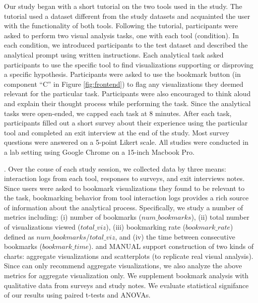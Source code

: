 Our study began with a short tutorial on the two tools used in the study.
The tutorial used a dataset different from the study datasets and acquainted
the user with the functionality of both tools.
Following the tutorial, participants were asked to perform two visual analysis 
tasks, one with each tool (condition).
In each condition, we introduced participants to the test dataset
and described the analytical prompt using written instructions.
Each analytical task asked participants to use the specific tool to find 
visualizations supporting or disproving a specific hypothesis.
Participants were asked to use the bookmark button (in component ``C'' in Figure 
\ref{fig:frontend}) to flag any visualizations they deemed relevant for the particular task.
Participants were also encouraged to think aloud and explain their thought process
while performing the task.
Since the analytical tasks were open-ended, we capped each task at 8 minutes.
After each task, participants filled out a short survey about their experience
using the particular tool and completed an exit interview at the end of the study.
Most survey questions were answered on a 5-point Likert scale.
All studies were conducted in a lab setting using Google Chrome on a 15-inch 
Macbook Pro.

.
Over the couse of each study session, we collected data by three means: interaction logs 
from each tool, responses to surveys, and exit interviews notes.
Since users were asked to bookmark visualizations they found to be relevant to the task,
bookmarking behavior from tool interaction logs provides a rich source
of information about the analytical process.
Specifically, we study a number of metrics including: (i) number of bookmarks ($num\_bookmarks$), 
(ii) total number of visualizations viewed ($total\_viz$), 
(iii) bookmarking rate ($bookmark\_rate$) defined as $num\_bookmarks$/$total\_viz$, and 
(iv) the time between consecutive bookmarks ($bookmark\_time$).
\SeeDB and MANUAL support construction of two kinds of charts: aggregate visualizations and 
scatterplots (to replicate real visual analysis).
Since \SeeDB can only recommend aggregate visualizations, we also analyze the above
metrics for aggregate visualization only.
We supplement bookmark analysis with qualitative data from surveys and study notes.
We evaluate statistical signifance of our results using paired t-tests and ANOVAs.


